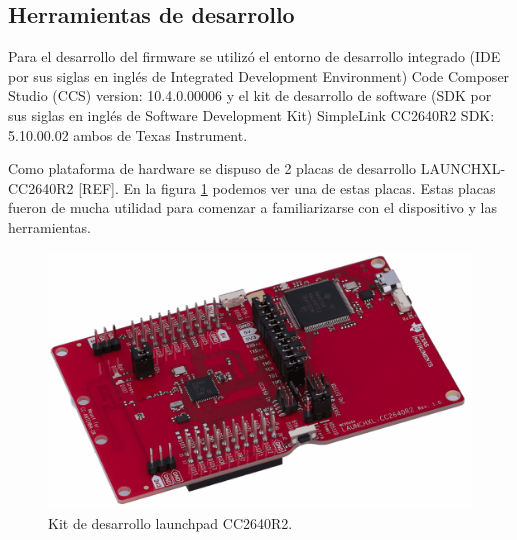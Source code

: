\begin{enumerate}
\end{enumerate}

\subsection{Herramientas de desarrollo}
Para el desarrollo del firmware se utilizó el entorno de desarrollo integrado (IDE por sus siglas en inglés de Integrated Development Environment) Code Composer Studio (CCS) version: 10.4.0.00006 y el kit de desarrollo de software (SDK por sus siglas en inglés de Software Development Kit) SimpleLink CC2640R2 SDK: 5.10.00.02 ambos de Texas Instrument. 

Como plataforma de hardware se dispuso de 2 placas de desarrollo LAUNCHXL-CC2640R2 [REF]. En la figura \ref{fig:kitDesarrolloCC2640R2} podemos ver una de estas placas. Estas placas fueron de mucha utilidad para comenzar a familiarizarse con el dispositivo y las herramientas. 

\vspace{1cm}

\begin{figure}[htbp]
	\centering
	\includegraphics[width=1\textwidth]{./Figures/LaunchpadCC2640R2.png}
	\caption{Kit de desarrollo launchpad CC2640R2.}
	\label{fig:kitDesarrolloCC2640R2}
\end{figure}

\vspace{1cm}

